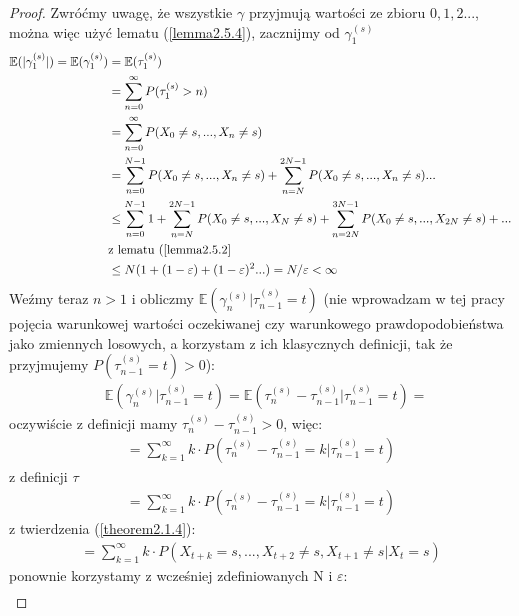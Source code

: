 \documentclass[a4paper]{article}
\theoremstyle{defn}
\theoremstyle{theorem}
\theoremstyle{lemma}
\theoremstyle{cor}
\theoremstyle{fact}
\begin{document}
\begin{proof}
Zwróćmy uwagę, że wszystkie $\gamma$ przyjmują wartości ze zbioru $0,1,2...$, można więc użyć lematu (\ref{lemma2.5.4}), zacznijmy od $\gamma_1^{(s)}$
\begin{align*}
    \mathbb{E}(|\gamma_1^{(s)}|) = \mathbb{E}(\gamma_1^{(s)}) &= \mathbb{E}(\tau_1^{(s)})\\
    &= \sum\limits_{n = 0}^{\infty} P(\tau_1^{(s)} > n) \\
    &= \sum\limits_{n = 0}^{\infty} P(X_0 \neq s,..., X_n \neq s) \\
    &= \sum\limits_{n = 0}^{N-1} P(X_0 \neq s,..., X_n \neq s) + \sum\limits_{n = N}^{2N - 1} P(X_0 \neq s,..., X_n \neq s) ...\\
    &\leq \sum\limits_{n = 0}^{N-1} 1 + \sum\limits_{n = N}^{2N - 1} P(X_0 \neq s,..., X_N \neq s) + \sum\limits_{n = 2N}^{3N - 1} P(X_0 \neq s,..., X_{2N} \neq s)+...\\
    &\text{z lematu (\ref{lemma2.5.2}}\\
    &\leq N(1 + (1-\varepsilon) + (1 - \varepsilon)^2 ...) = N/\varepsilon < \infty
\end{align*}
Weźmy teraz $n>1$ i obliczmy $\mathbb{E}(\gamma^{(s)}_n|\tau^{(s)}_{n-1} = t)$ (nie wprowadzam w tej pracy pojęcia warunkowej wartości oczekiwanej czy warunkowego prawdopodobieństwa jako zmiennych losowych, a korzystam z ich klasycznych definicji, tak że przyjmujemy $P(\tau^{(s)}_{n-1} = t) > 0$):
\begin{align*}
    &\mathbb{E}(\gamma^{(s)}_n|\tau^{(s)}_{n-1} = t) = \mathbb{E}(\tau^{(s)}_{n}-\tau^{(s)}_{n-1}|\tau^{(s)}_{n-1} = t) =
\end{align*}
oczywiście z definicji mamy $\tau^{(s)}_{n}-\tau^{(s)}_{n-1} > 0$, więc:
\begin{align*}
    =\sum\limits_{k = 1}^{\infty} k\cdot P(\tau^{(s)}_{n}-\tau^{(s)}_{n-1} = k|\tau^{(s)}_{n-1} = t)
\end{align*}
z definicji $\tau$
\begin{align*}
    =\sum\limits_{k = 1}^{\infty} k\cdot P(\tau^{(s)}_{n}-\tau^{(s)}_{n-1} = k|\tau^{(s)}_{n-1} = t)
\end{align*}
z twierdzenia (\ref{theorem2.1.4}):
\begin{align*}
    =\sum\limits_{k = 1}^{\infty} k\cdot P(X_{t+k} = s, ..., X_{t+2} \neq s, X_{t+1} \neq s| X_t = s)
\end{align*}
ponownie korzystamy z wcześniej zdefiniowanych N i $\varepsilon$:
\begin{align*}

\end{align*}
\end{proof}
\end{document}
